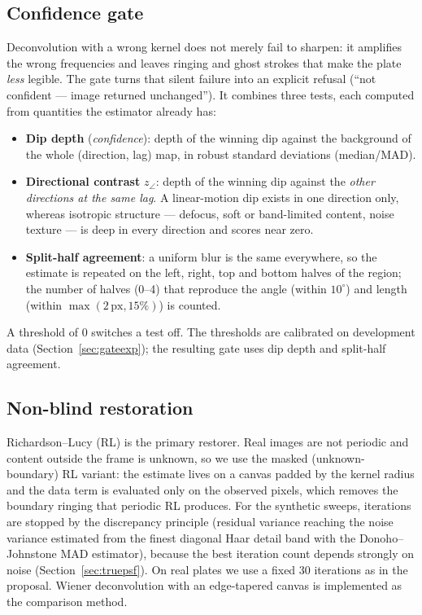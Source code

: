 \subsection{Confidence gate}
\label{sec:gate}
Deconvolution with a wrong kernel does not merely fail to sharpen: it amplifies the wrong
frequencies and leaves ringing and ghost strokes that make the plate \emph{less} legible. The gate
turns that silent failure into an explicit refusal (``not confident --- image returned
unchanged''). It combines three tests, each computed from quantities the estimator already has:
\begin{itemize}
  \item \textbf{Dip depth} (\emph{confidence}): depth of the winning dip against the background of
        the whole (direction, lag) map, in robust standard deviations (median/MAD).
  \item \textbf{Directional contrast} $z_\angle$: depth of the winning dip against the
        \emph{other directions at the same lag}. A linear-motion dip exists in one direction
        only, whereas isotropic structure --- defocus, soft or band-limited content, noise
        texture --- is deep in every direction and scores near zero.
  \item \textbf{Split-half agreement}: a uniform blur is the same everywhere, so the estimate is
        repeated on the left, right, top and bottom halves of the region; the number of halves
        (0--4) that reproduce the angle (within $10^\circ$) and length (within
        $\max(2\,\text{px}, 15\%)$) is counted.
\end{itemize}
A threshold of 0 switches a test off. The thresholds are calibrated on development data
(Section~\ref{sec:gateexp}); the resulting gate uses dip depth and split-half agreement.

\subsection{Non-blind restoration}
Richardson--Lucy (RL) is the primary restorer. Real images are not periodic and content outside
the frame is unknown, so we use the masked (unknown-boundary) RL variant: the estimate lives on a
canvas padded by the kernel radius and the data term is evaluated only on the observed pixels,
which removes the boundary ringing that periodic RL produces. For the synthetic sweeps, iterations
are stopped by the discrepancy principle (residual variance reaching the noise variance estimated
from the finest diagonal Haar detail band with the Donoho--Johnstone MAD estimator), because the best iteration count
depends strongly on noise (Section~\ref{sec:truepsf}). On real plates we use a fixed 30 iterations
as in the proposal. Wiener deconvolution with an edge-tapered canvas is implemented as the
comparison method.

